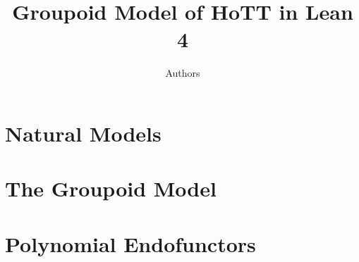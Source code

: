 
\title{Groupoid Model of HoTT in Lean 4}
\author{Authors}


\maketitle

\section{Natural Models}

\section{The Groupoid Model}

\section{Polynomial Endofunctors}


{}



